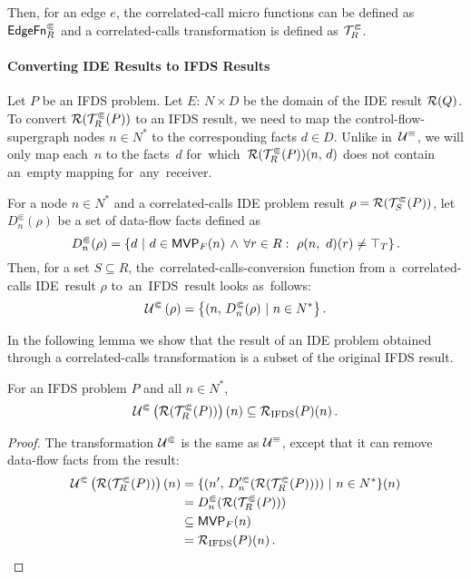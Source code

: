 Then, for an edge $e$, the correlated-call micro functions can be defined as $\textsf{EdgeFn}^\Subset_{R}$ and a correlated-calls transformation is defined as $\mathcal T^\Subset_R$.

\paragraph{Converting IDE Results to IFDS Results}

Let $P$ be an IFDS problem. 
Let $E:\,N\times D$ be the domain of the IDE result $\mathcal R(Q)$.
To convert $\mathcal R(\mathcal T^\Subset_R(P))$ to an IFDS result, we need to map the control-flow-supergraph nodes $n\in N^*$ to the corresponding facts $d\in D$. 
Unlike in~$\mathcal U^\equiv$, we will only map each~$n$ to the facts~$d$ for~which~$\mathcal R(\mathcal T^\Subset_R(P))(n,\,d)$ does not contain an~empty mapping for~any~receiver. 

For a node $n\in N^*$ and a correlated-calls IDE problem result $\rho=\mathcal R(\mathcal T^\Subset_S(P))$, let $D_n^\Subset(\rho)$ be a set of data-flow facts defined as
\begin{equation}\label{eq:dnq}
  D_n^\Subset(\rho)=\left\{d\ |\ 
    d\in\mvp F(n)\,\wedge\,\forall r\in R:\ \rho(n,\ d)(r)\ne\top_T\right\}.
\end{equation}
Then, for a set $S\subseteq R$, the~correlated-calls-conversion function from a~correlated-calls IDE~result $\rho$ to~an~IFDS~result looks as~follows:
\begin{equation}\label{eq:ucc}
  \mathcal U^\Subset\left(\rho\right)=
    \left\{(n,\,D_n^\Subset(\rho)\ | \ n\in N^*\right\}.
\end{equation}

In the following lemma we show that the result of an IDE problem obtained through a correlated-calls transformation is a subset of the original IFDS result.

\begin{lemma}[Precision]\label{lem:subsetifds}
    For an IFDS problem $P$ and all ${n\in N^*}$,
    \begin{equation}\label{eq:correct}
      \mathcal U^\Subset\left(\mathcal R(\mathcal T^\Subset_R(P))\right)(n)
      \subseteq
      \mathcal R_{\text{IFDS}}(P)(n)\,.
    \end{equation}
\end{lemma}
\begin{proof}
  The transformation $\mathcal U^\Subset$ is the same as $\mathcal U^\equiv$, except that it can remove data-flow facts from the result:
  \begin{align*}
    \backCC\left(\result(\transCC_R(P))\right)(n)&=\{(n',\,D_n'^\Subset(\result(\transCC_R(P))))\ |\ n\in N^*\}(n)\\
      &=D_n^\Subset(\result(\transCC_R(P)))\\
      &\subseteq\mvp F(n)\\
      &=\result_\text{IFDS}(P)(n)\,.\qedhere
  \end{align*}
\end{proof}

